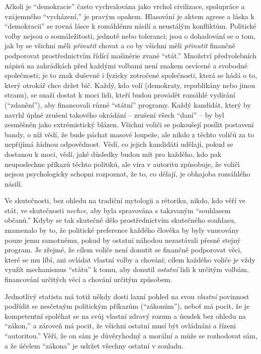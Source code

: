 \documentclass{book}
\begin{document}
Ačkoli je \enquote{demokracie} často vychvalována jako vrchol civilizace, spolupráce a vzájemného \enquote{vycházení,} je pravým opakem. Hlasování je aktem agrese a láska k \enquote{demokracii} se rovná lásce k rozsáhlému násilí a neustálým konfliktům. Politické volby nejsou o sounáležitosti, jednotě nebo toleranci; jsou o dohadování se o tom, jak by se všichni měli \emph{přinutit} chovat a co by všichni měli \emph{přinutit} finančně podporovat prostřednictvím řídící mašinérie zvané \enquote{stát.} Množství předvolebních nápisů na zahrádkách před každými volbami není znakem osvícené a svobodné společnosti; je to znak duševně i fyzicky zotročené společnosti, která se hádá o to, který otrokář chce držet bič. Každý, kdo volí (demokraty, republikány nebo jinou stranu), se snaží dostat k moci lidi, kteří budou provádět rozsáhlé vydírání (\enquote{zdanění}), aby financovali různé \enquote{státní} programy. Každý kandidát, který by navrhl úplné zrušení takového okrádání -- zrušení všech \enquote{daní} -- by byl zesměšněn jako extrémistický blázen. Všichni voliči se pokoušejí posílit postavení bandy, o níž vědí, že bude páchat masové loupeže, ale nikdo z těchto voličů za to nepřijímá žádnou odpovědnost. Vědí, co jejich kandidáti udělají, pokud se dostanou k moci, vědí, jaké důsledky budou mít pro každého, kdo pak neuposlechne příkazů těchto politiků, ale víra v autoritu způsobuje, že voliči nejsou psychologicky schopni rozpoznat, že to, co dělají, je obhajoba rozsáhlého násilí.

Ve skutečnosti, bez ohledu na tradiční mytologii a rétoriku, nikdo, kdo věří ve stát, ve skutečnosti \emph{nechce}, aby byla spravována s takzvaným \enquote{souhlasem občanů.} Kdyby se tak skutečně dělo prostřednictvím skutečného souhlasu, znamenalo by to, že politické preference každého člověka by byly vnucovány pouze jemu samotnému, pokud by ostatní náhodou nezastávali přesně stejný program. Je zřejmé, že cílem voliče není donutit se finančně podporovat věci, které se mu líbí, ani ovládat vlastní volby a chování; cílem každého voliče je vždy využít mechanismus \enquote{státu} k tomu, aby donutil \emph{ostatní} lidi k určitým volbám, financování určitých věcí a chování určitým způsobem.

Jednotlivý etatista má totiž někdy dosti laxní pohled na svou \emph{vlastní} povinnost podřídit se nesčetným politickým příkazům (\enquote{zákonům}), neboť má pocit, že je kompetentní spoléhat se na svůj vlastní zdravý rozum a úsudek bez ohledu na \enquote{zákon,} a zároveň má pocit, že všichni ostatní musí být ovládnáni a řízeni \enquote{autoritou.} Věří, že on sám je důvěryhodný a morální a může se rozhodovat sám, a že účelem \enquote{zákona} je udržet všechny ostatní v souladu.
\end{document}
